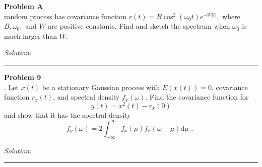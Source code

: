 \documentclass[a4paper, 11pt]{article}
\newenvironment{problem}[2][Problem]
    { \begin{mdframed}[backgroundcolor=gray!20] \textbf{#1 #2} \\}
    {  \end{mdframed}}
\newenvironment{solution}
    {\textit{Solution:}}
    {}
\begin{document}
\begin{problem}{3.8}
A random process has covariance function $r(t)=B \cos ^{2}\left(\omega_{0} t\right) e^{-W|t|},$
where $B, \omega_{0},$ and $W$ are positive constants. Find and sketch the spectrum
when $\omega_{0}$ is much larger than $W$.
\end{problem}
\begin{solution}


\end{solution} 
%
\noindent\rule{7in}{2.8pt}

\begin{problem}{3.9}
9. Let $x(t)$ be a stationary Gaussian process with $E(x(t))=0$, covariance
function $r_{x}(t)$, and spectral density $f_{x}(\omega)$. Find the covariance function for
$$
y(t)=x^{2}(t)-r_{x}(0)
$$
and show that it has the spectral density
$$
f_{y}(\omega)=2 \int_{-\infty}^{\infty} f_{x}(\mu) f_{x}(\omega-\mu) \mathrm{d} \mu \text { . }
$$
\end{problem}
\begin{solution}


\end{solution} 
%
\noindent\rule{7in}{2.8pt}

\end{document}
